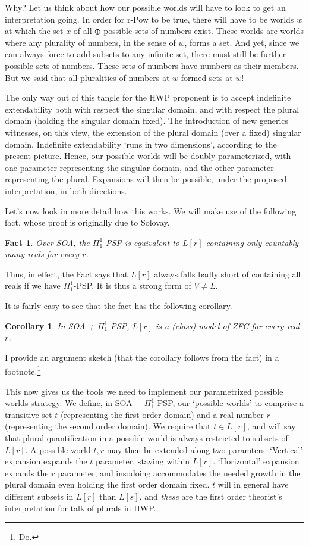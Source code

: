 \documentclass{article}
\newtheorem{fact}[theorem]{Fact}
\newtheorem{corollary}[theorem]{Corollary}
\begin{document}
Why?
Let us think about how our possible worlds will have 
to look to get an interpretation going. In order for r-Pow to be true, 
there will have to be worlds $w$ at which the set $x$ 
of all $\circledbar$-possible sets of numbers 
exist. These worlds are worlds where 
any plurality of numbers, in the sense of $w$, forms a set. 
And yet, since we can always force to add subsets to any infinite set, 
there must still be further possible sets of numbers. These sets of numbers 
have numbers as their members. But we said that all pluralities of numbers at 
$w$ formed sets at $w$!

The only way out of this tangle for the HWP proponent is to accept indefinite 
extendability both with respect the singular domain, and with respect the plural 
domain (holding the singular domain fixed). The introduction of new generics 
witnesses, on this view, the extension of the plural domain (over a fixed) singular 
domain. Indefinite extendability `runs in two dimensions', according to the present 
picture. Hence, our possible worlds will be doubly parameterized, with one 
parameter representing the singular domain, and the other parameter representing the
plural. Expansions will then be possible, under the proposed interpretation, in 
both directions. 

Let's now look in more detail 
how this works. We will make use of the following fact, whose proof 
is originally due to Solovay.
\begin{fact}\label{sol}
    Over SOA, the $\Pi_1^1$-PSP is equivalent to $L[r]$ containing only 
    countably many reals for every $r$.
\end{fact}
Thus, in effect, the Fact says that $L[r]$ always falls badly short of containing 
all reals if we have $\Pi_1^1$-PSP. It is thus a strong form of $V \not = L$.

It is fairly easy to see that the fact has the following corollary.
\begin{corollary}
    In  SOA + $\Pi_1^1$-PSP, $L[r]$ is a (class) model of ZFC for every real $r$.
\end{corollary}
I provide an argument sketch (that the corollary follows from the fact) in 
a footnote.\footnote{
    Do.
}

This now gives us the tools we need to implement our parametrized possible worlds 
strategy. We define, in SOA + $\Pi_1^1$-PSP, our `possible worlds' to comprise
a transitive set $t$ (representing the first order domain) and a real number $r$
(representing the second order domain). We require that $t \in L[r]$, 
and will say that plural quantification in a possible world is always 
restricted to subsets of $L[r]$. A possible world $t, r$ may then be extended 
along two paramters. `Vertical' expansion expands the $t$ parameter, staying within 
$L[r]$. `Horizontal' expansion expands the $r$ parameter, and insodoing 
accommodates the needed growth in the plural domain even holding the first 
order domain fixed. $t$ will in general have different subsets in $L[r]$ than 
$L[s]$, and \emph{these} are the first order theorist's interpretation for talk of 
plurals in HWP. 
\end{document}
